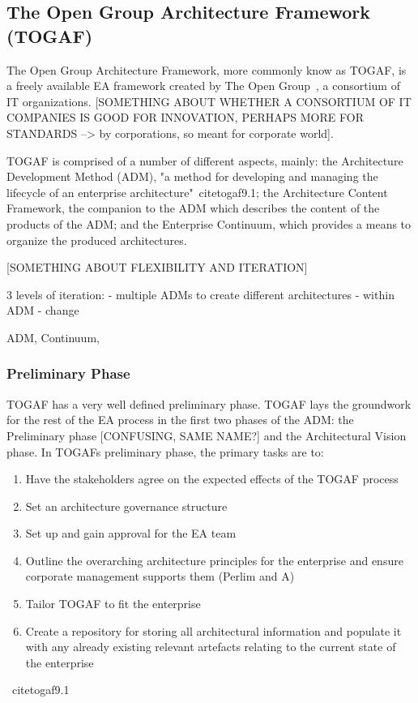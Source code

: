 
\subsection{The Open Group Architecture Framework (TOGAF)}
The Open Group Architecture Framework, more commonly know as TOGAF, is a freely available EA framework created by The Open Group~\cite{togaf9.1}, a consortium of IT organizations. [SOMETHING ABOUT WHETHER A CONSORTIUM OF IT COMPANIES IS GOOD FOR INNOVATION, PERHAPS MORE FOR STANDARDS --> by corporations, so meant for corporate world]. 

TOGAF is comprised of a number of different aspects, mainly: the Architecture Development Method (ADM), "a method for developing and managing the lifecycle of an enterprise
architecture"~cite{togaf9.1}; the Architecture Content Framework, the companion to the ADM which describes the content of the products of the ADM; and the Enterprise Continuum, which provides a means to organize the produced architectures. 

[SOMETHING ABOUT FLEXIBILITY AND ITERATION]

3 levels of iteration:
- multiple ADMs to create different architectures
- within ADM
- change

ADM, Continuum,  \cite{lankhorst2009}

\subsubsection{Preliminary Phase}
TOGAF has a very well defined preliminary phase. TOGAF lays the groundwork for the rest of the EA process in the first two phases of the ADM: the Preliminary phase [CONFUSING, SAME NAME?] and the Architectural Vision phase. In TOGAFs preliminary phase, the primary tasks are to:
\begin{enumerate}
\item Have the stakeholders agree on the expected effects of the TOGAF process
\item Set an architecture governance structure
\item Set up and gain approval for the EA team 
\item Outline the overarching architecture principles for the enterprise and ensure corporate management supports them (Perlim and A)
\item Tailor TOGAF to fit the enterprise
\item Create a repository for storing all architectural information and populate it with any already existing relevant artefacts relating to the current state of the enterprise
\end{enumerate}
~cite{togaf9.1}


